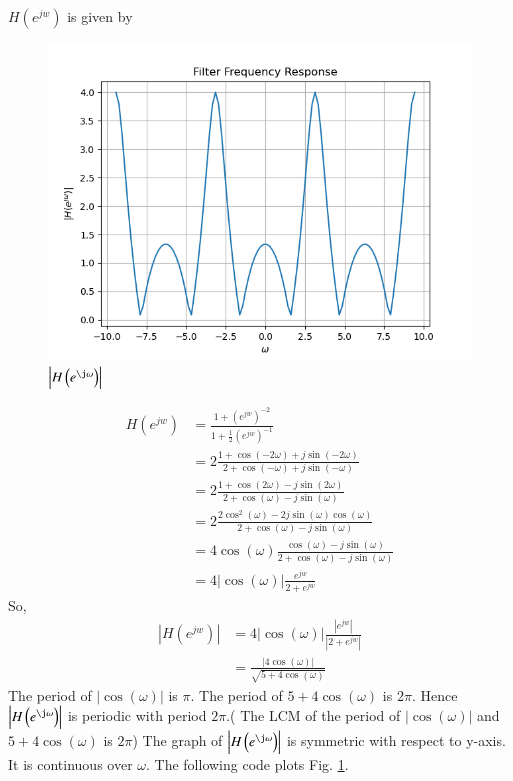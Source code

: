 \documentclass[journal,12pt,twocolumn]{IEEEtran}
\renewcommand\thesection{\arabic{section}}
\begin{document}
\begin{enumerate}[label=\thesection.\arabic*]
$H(e^{jw})$ is given by
\begin{figure}[!ht]
	\centering
	\includegraphics[width=\columnwidth]{./figs/4.5}
	\caption{$\abs{H\brak{e^{\j\omega}}}$}
	\label{fig:4.5}
\end{figure}
\begin{align}
	H(e^{jw})&=\frac{1+(e^{jw})^{-2}}{1+\frac{1}{2}(e^{jw})^{-1}}\\
	&=2\frac{1+\cos(-2\omega)+j\sin(-2\omega)}{2+\cos(-\omega)+j\sin(-\omega)}\\
	&=2\frac{1+\cos(2\omega)-j\sin(2\omega)}{2+\cos(\omega)-j\sin(\omega)}\\
	&=2\frac{2\cos^2(\omega)-2j\sin(\omega)\cos(\omega)}{2+\cos(\omega)-j\sin(\omega)}\\
	&=4\cos(\omega)\frac{\cos(\omega)-j\sin(\omega)}{2+\cos(\omega)-j\sin(\omega)}\\
	&=4|\cos(\omega)| \frac{e^{jw}}{2+e^{jw}}
\end{align}
So,
\begin{align}
	|H(e^{jw})|&=4 |\cos(\omega)| \frac{|e^{jw}|}{|2+e^{jw}|}\\
	&=\frac{|4\cos(\omega)|}{\sqrt{5+4\cos(\omega)}}
\end{align}
The period of $|\cos(\omega)|$ is $\pi$. The period of $5+4\cos(\omega)$ is $2\pi$. Hence $\abs{H\brak{e^{\j\omega}}}$ is periodic with period $2\pi$.( The LCM of the period of $|\cos(\omega)|$ and $5+4\cos(\omega)$ is $2\pi$)
The graph of $\abs{H\brak{e^{\j\omega}}}$ is symmetric with respect to y-axis. It is continuous over $\omega$. The following code plots Fig. \ref{fig:4.5}.


\end{enumerate}
\end{document}
